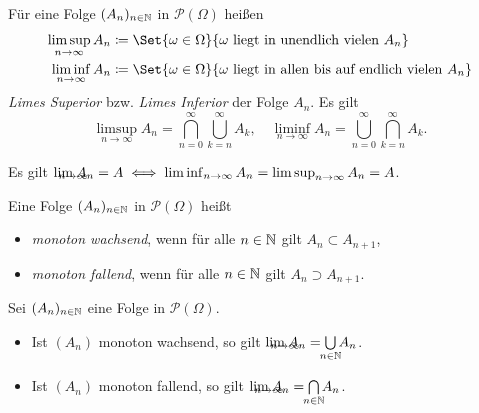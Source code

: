 \documentclass{cheat-sheet}
\newcommand{\PS}{\mathcal{P}} %
\newcommand{\PSO}{\PS(\Omega)} %
\theoremstyle{definition}
\begin{document}
\begin{defn}
  Für eine Folge $(A_n)_{n \in \mathbb{N}}$ in $\PS(\Omega)$ heißen
  \begin{align*}
    \limsup_{n \to \infty} A_n &\coloneqq \Set{ \omega \in \Omega }{ \omega \text{ liegt in unendlich vielen } A_n } \\
    \liminf_{n \to \infty} A_n &\coloneqq \Set{ \omega \in \Omega }{ \omega \text{ liegt in allen bis auf endlich vielen } A_n }
  \end{align*}
  \emph{Limes Superior} bzw. \emph{Limes Inferior} der Folge $A_n$. Es gilt
  \[
    \limsup_{n \to \infty} A_n = \bigcap_{n = 0}^\infty \bigcup_{k = n}^\infty A_k, \quad
    \liminf_{n \to \infty} A_n = \bigcup_{n = 0}^\infty \bigcap_{k = n}^\infty A_k.
  \]
\end{defn}


\begin{satz}
  Es gilt $\lim_{\mathclap{n \to \infty}} A_n = A \iff \liminf_{n \to \infty} A_n = \limsup_{n \to \infty} A_n = A$.
\end{satz}

\begin{defn}
  Eine Folge $(A_n)_{n \in \mathbb{N}}$ in $\PSO$ heißt
  \begin{itemize}
    \item \emph{monoton wachsend}, wenn für alle $n \in \mathbb{N}$ gilt $A_n \subset A_{n+1}$,
    \item \emph{monoton fallend}, wenn für alle $n \in \mathbb{N}$ gilt $A_n \supset A_{n+1}$.
  \end{itemize}
\end{defn}

\begin{satz}
  Sei $(A_n)_{n \in \mathbb{N}}$ eine Folge in $\PSO$.
  \begin{itemize}
    \item Ist $(A_n)$ monoton wachsend, so gilt $\lim_{\mathclap{n \to \infty}} A_n = \bigcup_{\mathclap{n \in \N}} A_n$.
    \item Ist $(A_n)$ monoton fallend, so gilt $\lim_{\mathclap{n \to \infty}} A_n = \bigcap_{\mathclap{n \in \N}} A_n$.
  \end{itemize}
\end{satz}
\end{document}
